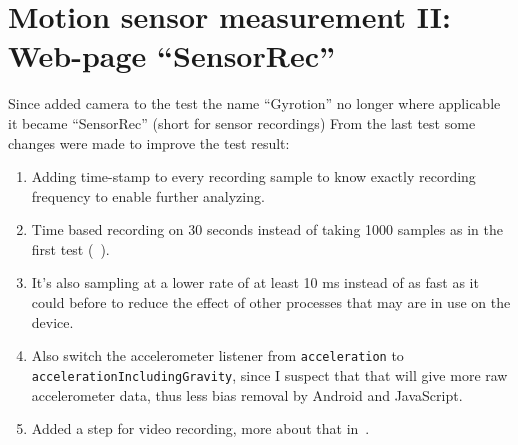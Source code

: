 \section{Motion sensor measurement II: Web-page ``SensorRec''}\label{sec:measurement:sensorrec}
Since added camera to the test the name ``Gyrotion'' no longer where applicable it became ``SensorRec'' (short for sensor recordings)
From the last test some changes were made to improve the test result:
\begin{enumerate}
  \item Adding time-stamp to every recording sample to know exactly recording frequency to enable further analyzing.
  \item Time based recording on 30 seconds instead of taking 1000 samples as in the first test (~).
  \item It's also sampling at a lower rate of at least 10 ms instead of as fast as it could before to reduce the effect of other processes that may are in use on the device.
  \item Also switch the accelerometer listener from \texttt{acceleration} to \texttt{accelerationIncludingGravity}, since I suspect that that will give more raw accelerometer data, thus less bias removal by Android and JavaScript. 
  \item Added a step for video recording, more about that in~.
\end{enumerate}
